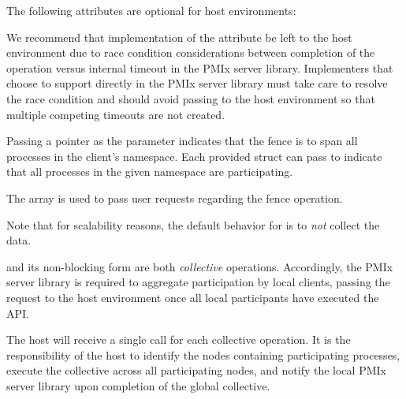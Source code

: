 
\reqattrend

\optattrstart
The following attributes are optional for host environments:


\optattrend

\adviceimplstart
We recommend that implementation of the  attribute be left to the host environment due to race condition considerations between completion of the operation versus internal timeout in the \ac{PMIx} server library. Implementers that choose to support  directly in the \ac{PMIx} server library must take care to resolve the race condition and should avoid passing  to the host environment so that multiple competing timeouts are not created.
\adviceimplend

\descr

Passing a  pointer as the  parameter indicates that the fence is to span all processes in the client's namespace.
Each provided  struct can pass  to indicate that all processes in the given namespace are participating.

The  array is used to pass user requests regarding the fence operation.

Note that for scalability reasons, the default behavior for  is to \emph{not} collect the data.

\adviceimplstart
{} and its non-blocking form are both \emph{collective} operations. Accordingly, the \ac{PMIx} server library is required to aggregate participation by local clients, passing the request to the host environment once all local participants have executed the \ac{API}.
\adviceimplend

\advicermstart
The host will receive a single call for each collective operation. It is the responsibility of the host to identify the nodes containing participating processes, execute the collective across all participating nodes, and notify the local \ac{PMIx} server library upon completion of the global collective.
\advicermend

\subsection{}

